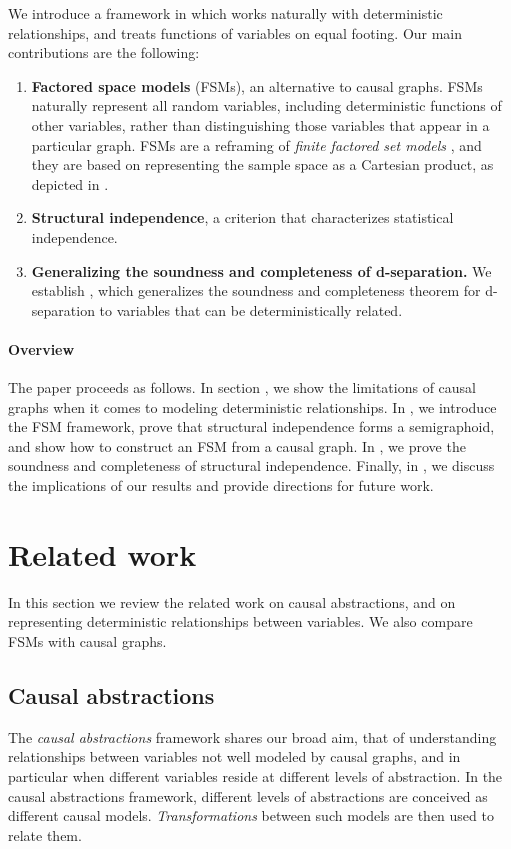 \documentclass[USenglish,onecolumn]{article}
\begin{document}
We introduce a framework in which works naturally with deterministic relationships, and treats functions of variables on equal footing.
Our main contributions are the following:
\begin{enumerate}[itemsep=0pt]
    \item \textbf{Factored space models} (FSMs), an alternative to causal graphs. FSMs naturally represent all random variables, including deterministic functions of other variables, rather than distinguishing those variables that appear in a particular graph. FSMs are a reframing of \emph{finite factored set models} \cite{garrabrant2021temporal}, and they are based on representing the sample space as a Cartesian product, as depicted in .
    \item \textbf{Structural independence}, a criterion that characterizes statistical independence. 
    \item \textbf{Generalizing the soundness and completeness of d-separation.}     We establish , which  generalizes the soundness and completeness theorem for d-separation \cite{koller2009probabilistic} to variables that can be deterministically related. 
\end{enumerate}

\paragraph*{Overview} The paper proceeds as follows. In section , we show the limitations of causal graphs when it comes to modeling deterministic relationships. 
In , we introduce the FSM framework, prove that structural independence forms a semigraphoid, and show how to construct an FSM from a causal graph. In , we prove the soundness and completeness of structural independence. 
Finally, in , we discuss the implications of our results and provide directions for future work.

\section{Related work}
\label{sec:relatedwork}
In this section we review the related work on causal abstractions, and on representing deterministic relationships between variables. We also compare FSMs with causal graphs.

\subsection{Causal abstractions}
The \emph{causal abstractions} framework \cite{beckers2019abstracting} \cite{beckers2020approximate} \cite{rubenstein2017causal} \cite{zennaro2022abstraction} shares our broad aim, that of understanding relationships between variables not well modeled by causal graphs, and in particular when different variables reside at different levels of abstraction.
In the causal abstractions framework, different levels of abstractions are conceived as different causal models.
\emph{Transformations} between such models are then used to relate them.
\end{document}
